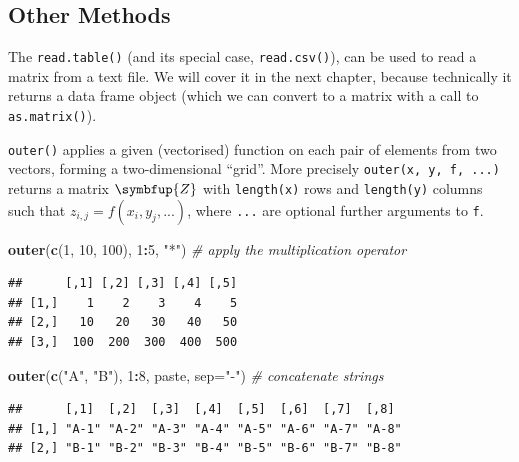 \documentclass[10pt,b5paper,krantz1]{krantz}
\newenvironment{Shaded}{\begin{snugshade}}{\end{snugshade}}
\newcommand{\CommentTok}[1]{\textcolor[rgb]{0.37,0.37,0.37}{\textit{#1}}}
\newcommand{\DataTypeTok}[1]{\textcolor[rgb]{0.27,0.27,0.27}{#1}}
\newcommand{\DecValTok}[1]{\textcolor[rgb]{0.06,0.06,0.06}{#1}}
\newcommand{\KeywordTok}[1]{\textcolor[rgb]{0.27,0.27,0.27}{\textbf{#1}}}
\newcommand{\NormalTok}[1]{#1}
\newcommand{\OperatorTok}[1]{\textcolor[rgb]{0.43,0.43,0.43}{\textbf{#1}}}
\newcommand{\StringTok}[1]{\textcolor[rgb]{0.5,0.5,0.5}{#1}}
\renewcommand{\mathbf}[1]{\symbfup{#1}}
\begin{document}
\hypertarget{other-methods}{%
\subsection{Other Methods}\label{other-methods}}

The \texttt{read.table()} (and its special case, \texttt{read.csv()}),
can be used to read a matrix from a text file.
We will cover it in the next chapter, because technically
it returns a data frame object (which we can convert to a matrix with a call
to \texttt{as.matrix()}).

\texttt{outer()} applies a given (vectorised) function
on each pair of elements from two vectors, forming a two-dimensional ``grid''.
More precisely \texttt{outer(x,\ y,\ f,\ ...)} returns a matrix \(\mathbf{Z}\) with
\texttt{length(x)}
rows and \texttt{length(y)} columns such that \(z_{i,j}=f(x_i, y_j, ...)\),
where \texttt{...} are optional further arguments to \texttt{f}.

\begin{Shaded}
\begin{Highlighting}[]
\KeywordTok{outer}\NormalTok{(}\KeywordTok{c}\NormalTok{(}\DecValTok{1}\NormalTok{, }\DecValTok{10}\NormalTok{, }\DecValTok{100}\NormalTok{), }\DecValTok{1}\OperatorTok{:}\DecValTok{5}\NormalTok{, }\StringTok{"*"}\NormalTok{) }\CommentTok{# apply the multiplication operator}
\end{Highlighting}
\end{Shaded}

\begin{verbatim}
##      [,1] [,2] [,3] [,4] [,5]
## [1,]    1    2    3    4    5
## [2,]   10   20   30   40   50
## [3,]  100  200  300  400  500
\end{verbatim}

\begin{Shaded}
\begin{Highlighting}[]
\KeywordTok{outer}\NormalTok{(}\KeywordTok{c}\NormalTok{(}\StringTok{"A"}\NormalTok{, }\StringTok{"B"}\NormalTok{), }\DecValTok{1}\OperatorTok{:}\DecValTok{8}\NormalTok{, paste, }\DataTypeTok{sep=}\StringTok{"-"}\NormalTok{) }\CommentTok{# concatenate strings}
\end{Highlighting}
\end{Shaded}

\begin{verbatim}
##      [,1]  [,2]  [,3]  [,4]  [,5]  [,6]  [,7]  [,8] 
## [1,] "A-1" "A-2" "A-3" "A-4" "A-5" "A-6" "A-7" "A-8"
## [2,] "B-1" "B-2" "B-3" "B-4" "B-5" "B-6" "B-7" "B-8"
\end{verbatim}
\end{document}
